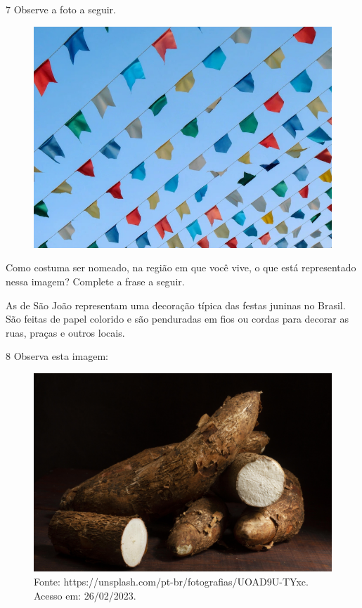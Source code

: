 
\num{7} Observe a foto a seguir.

\begin{figure}[htpb!]
\includegraphics[width=\textwidth]{./imgs/img19.jpg}
\end{figure}


Como costuma ser nomeado, na região em que você vive, o que está representado nessa imagem?
Complete a frase a seguir.\bigskip

As  de São João representam uma decoração típica das
festas juninas no Brasil. São feitas de papel colorido e são penduradas
em fios ou cordas para decorar as ruas, praças e outros locais.

\pagebreak

\num{8} Observa esta imagem:

\begin{figure}[htpb!]
\centering
\includegraphics[width=.5\textwidth]{./imgs/img19b.jpg}
\caption{Fonte: https://unsplash.com/pt-br/fotografias/UOAD9U-TYxc. Acesso em: 26/02/2023.}
\end{figure}

